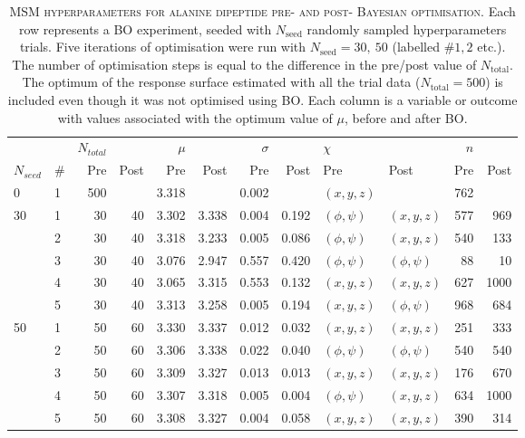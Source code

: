 \begin{table}
\centering
\begin{tabular}{llrrrrrrllrr}
\toprule
   &   & $N_{total}$ & & $\mu$ & & $\sigma$ & & $\chi$ &  & $n$ & \\
 $N_{seed}$  &   \#  &         Pre & Post &   Pre &  Post &      Pre &  Post &  Pre & Post & Pre & Post \\
\midrule
0  & 1 &         500 &      & 3.318 &       &    0.002 &       &     $(x, y, z)$ &              & 762 &      \\
\midrule
30 & 1 &          30 &   40 & 3.302 & 3.338 &    0.004 & 0.192 &  $(\phi, \psi)$ &     $(x, y, z)$ & 577 &  969 \\
   & 2 &          30 &   40 & 3.318 & 3.233 &    0.005 & 0.086 &  $(\phi, \psi)$ &     $(x, y, z)$ & 540 &  133 \\
   & 3 &          30 &   40 & 3.076 & 2.947 &    0.557 & 0.420 &  $(\phi, \psi)$ &  $(\phi, \psi)$ &  88 &   10 \\
   & 4 &          30 &   40 & 3.065 & 3.315 &    0.553 & 0.132 &     $(x, y, z)$ &     $(x, y, z)$ & 627 & 1000 \\
   & 5 &          30 &   40 & 3.313 & 3.258 &    0.005 & 0.194 &     $(x, y, z)$ &  $(\phi, \psi)$ & 968 &  684 \\
   \midrule
50 & 1 &          50 &   60 & 3.330 & 3.337 &    0.012 & 0.032 &     $(x, y, z)$ &     $(x, y, z)$ & 251 &  333 \\
   & 2 &          50 &   60 & 3.306 & 3.338 &    0.022 & 0.040 &  $(\phi, \psi)$ &  $(\phi, \psi)$ & 540 &  540 \\
   & 3 &          50 &   60 & 3.309 & 3.327 &    0.013 & 0.013 &     $(x, y, z)$ &     $(x, y, z)$ & 176 &  670 \\
   & 4 &          50 &   60 & 3.307 & 3.318 &    0.005 & 0.004 &  $(\phi, \psi)$ &     $(x, y, z)$ & 634 & 1000 \\
   & 5 &          50 &   60 & 3.308 & 3.327 &    0.004 & 0.058 &     $(x, y, z)$ &     $(x, y, z)$ & 390 &  314 \\
\bottomrule
\end{tabular}
\caption[MSM hyperparameters for alanine dipeptide pre- and post- Bayesian optimisation]{\textsc{MSM hyperparameters for alanine dipeptide pre- and post- Bayesian optimisation}.  Each row represents a BO experiment, seeded with $N_{\mathrm{seed}}$ randomly sampled hyperparameters trials. Five iterations of optimisation were run with $N_{\mathrm{seed}}=30,\ 50$ (labelled $\# 1, 2$ etc.). The number of optimisation steps is equal to the difference in the pre/post value of $N_{\mathrm{total}}$.  The optimum of the response surface estimated with all the trial data ($N_{\mathrm{total}}=500$) is included even though it was not optimised using BO. Each column is a variable or outcome with values associated with the optimum value of $\mu$, before and after BO.  
}\label{tab:ala1_best_params}
\end{table}

